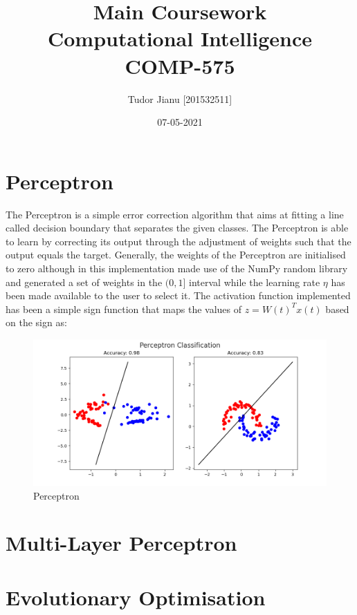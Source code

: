 \documentclass{report}
\title{Main Coursework \\ Computational Intelligence \\ COMP-575}
\author{Tudor Jianu [201532511]}
\date{07-05-2021}
\begin{document}
\maketitle

\chapter{Perceptron}
The Perceptron is a simple error correction algorithm that aims at fitting a line called decision boundary that separates the given classes. The Perceptron is able to learn by correcting its output through the adjustment of weights such that the output equals the target. 
Generally, the weights of the Perceptron are initialised to zero although in this implementation made use of the NumPy random library and generated a set of weights in the $(0,1]$ interval while the learning rate $\eta$ has been made available to the user to select it. The activation function implemented has been a simple sign function that maps the values of $z=W(t)^{T} x(t)$ based on the sign as:

 




\begin{figure}[htp]
\centering
\includegraphics[scale=0.70]{Perceptron/Perceptron.png}
\caption{Perceptron}
\label{Perceptron}
\end{figure}




\chapter{Multi-Layer Perceptron}

\subsection{}

\chapter{Evolutionary Optimisation}
\end{document}
